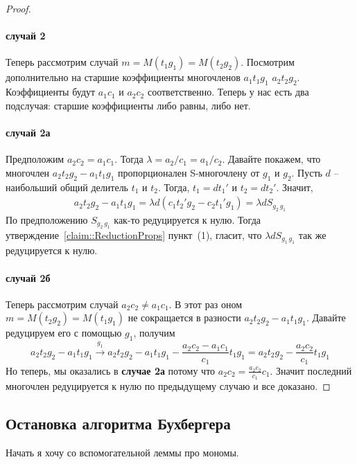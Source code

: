 \begin{proof}
\paragraph{случай 2}

Теперь рассмотрим случай $m = M(t_1 g_1) = M(t_2 g_2)$.
Посмотрим дополнительно на старшие коэффициенты многочленов $a_1t_1 g_1$ $a_2 t_2 g_2$.
Коэффициенты будут $a_1 c_1$ и $a_2 c_2$ соответственно.
Теперь у нас есть два подслучая: старшие коэффициенты либо равны, либо нет.

\paragraph{случай 2а}

Предположим $a_2 c_2 = a_1 c_1$.
Тогда $\lambda = a_2 / c_1 = a_1 / c_2$.
Давайте покажем, что многочлен $a_2t_2g_2 - a_1 t_1 g_1$ пропорционален S-многочлену от $g_1$ и $g_2$.
Пусть $d$ -- наибольший общий делитель $t_1$ и $t_2$.
Тогда, $t_1 = d t_1'$ и $t_2 = d t_2'$.
Значит,
\begin{gather*}
a_2t_2g_2 - a_1 t_1 g_1 = \lambda d \left(c_1 t_2' g_2 - c_2 t_1' g_1\right) = \lambda d S_{g_2\,g_1}
\end{gather*}
По предположению $S_{g_2\, g_1}$ как-то редуцируется к нулю.
Тогда утверждение~\ref{claim::ReductionProps} пункт~(1), гласит, что $\lambda d S_{g_1\,g_1}$ так же редуцируется к нулю.

\paragraph{случай 2б}

Теперь рассмотрим случай $a_2 c_2 \neq a_1 c_1$.
В этот раз оном $m = M(t_2 g_2) = M(t_1 g_1)$ не сокращается в разности $a_2t_2g_2 - a_1 t_1 g_1$.
Давайте редуцируем его с помощью $g_1$, получим
\[
a_2t_2g_2 - a_1 t_1 g_1 \stackrel{g_1}{\longrightarrow}
a_2t_2g_2 - a_1 t_1 g_1 - \frac{a_2 c_2 - a_1 c_1}{c_1}t_1 g_1 = a_2 t_2 g_2 - \frac{a_2 c_2}{c_1}t_1 g_1
\]
Но теперь, мы оказались в \textbf{случае 2а} потому что $a_2 c_2 = \frac{a_2 c_2}{c_1}c_1$.
Значит последний многочлен редуцируется к нулю по предыдущему случаю и все доказано.
\end{proof}

\subsection{Остановка алгоритма Бухбергера}

Начать я хочу со вспомогательной леммы про мономы.

